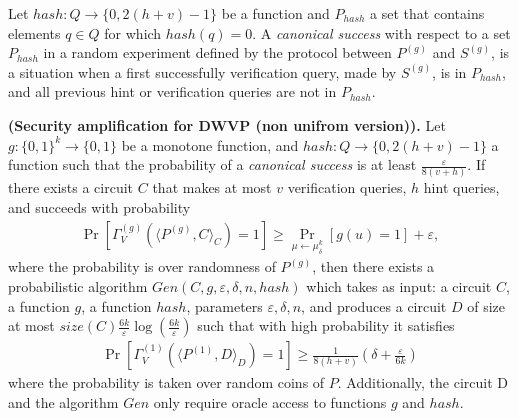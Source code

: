 \documentclass[11pt,a4paper,article,oneside]{memoir}
\begin{document}
Let $hash : Q \rightarrow \{0, 2(h+v)-1 \}$ be a function and $P_{hash}$ a set that contains elements $q \in Q$ for which $hash(q) = 0$.
A \textit{canonical success} with respect to a set $P_{hash}$ in
a random experiment defined by the protocol between $P^{(g)}$ and $S^{(g)}$,
is a situation when a first successfully verification query, made by $S^{(g)}$, is in $P_{hash}$,
and all previous hint or verification queries are not in $P_{hash}$.
%
%
\begin{theorem} {\textbf{(Security amplification for DWVP (non unifrom version)).}}
  Let $g: \{0,1\}^k \rightarrow \{0,1\}$ be a monotone function, and $hash:Q \rightarrow \{0,2(h+v)-1\}$ a function such that
  the probability of a \textit{canonical success} is at least $\frac{\varepsilon}{8\left(v + h\right)}$.
  If there exists a circuit $C$ that makes at most $v$ verification queries, $h$ hint queries,
  and succeeds with probability
  \begin{align}
    \Pr_{}[\Gamma_{V}^{(g)}( \langle P^{(g)},C \rangle_C ) = 1] \geq \Pr_{\mu \leftarrow \mu_{\delta}^{k}}[g(u) = 1] + \varepsilon ,
  \end{align}
  where the probability is over randomness of $P^{(g)}$,
  then there exists a probabilistic algorithm $Gen(C, g, \varepsilon, \delta, n, hash)$ which takes as input: a circuit $C$, a function $g$, a function $hash$,
  parameters $\varepsilon, \delta, n$, and produces a circuit $D$ of size at most $ size(C) \frac{6k}{\varepsilon} \log(\frac{6k}{\varepsilon}) $
  such that with high probability it satisfies
  \begin{align}
    \Pr_{}[\Gamma_V^{(1)} \left( \langle P^{(1)} ,D \rangle_D \right) = 1] \geq \frac{1}{8(h+v)} \left( \delta + \frac{\varepsilon}{6k} \right)
  \end{align}
  where the probability is taken over random coins of $P$.
  Additionally, the circuit D and the algorithm $Gen$ only require oracle access to functions $g$ and $hash$.
\end{theorem}



\end{document}
